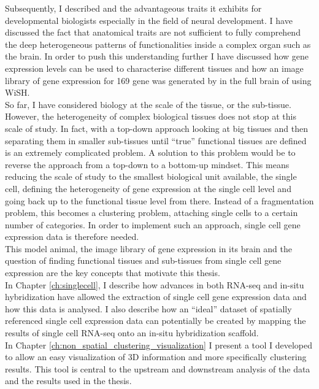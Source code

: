 	Subsequently, I described \platyfull{} and the advantageous traits it exhibits for developmental biologists especially in the field of neural development. I have discussed the fact that anatomical traits are not sufficient to fully comprehend the deep heterogeneous patterns of functionalities inside a complex organ such as the brain. In order to push this understanding further I have discussed how gene expression levels can be used to characterise different tissues and how an image library of gene expression for 169 gene was generated by \cite{Tomer10} in the full brain of \platy{} using WiSH.\\
	
	So far, I have considered biology at the scale of the tissue, or the sub-tissue. However, the heterogeneity of complex biological tissues does not stop at this scale of study. In fact, with a top-down approach looking at big tissues and then separating them in smaller sub-tissues until ``true'' functional tissues are defined is an extremely complicated problem. A solution to this problem would be to reverse the approach from a top-down to a bottom-up mindset. This means reducing the scale of study to the smallest biological unit available, the single cell, defining the heterogeneity of gene expression at the single cell level and going back up to the functional tissue level from there. Instead of a fragmentation problem, this becomes a clustering problem, attaching single cells to a certain number of categories. In order to implement such an approach, single cell gene expression data is therefore needed.\\
	
	This model animal, the image library of gene expression in its brain and the question of finding functional tissues and sub-tissues from single cell gene expression are the key concepts that motivate this thesis.\\
	
	In Chapter \ref{ch:singlecell}, I describe how advances in both RNA-seq and in-situ hybridization have allowed the extraction of single cell gene expression data and how this data is analysed. I also describe how an ``ideal'' dataset of spatially referenced single cell expression data can potentially be created by mapping the results of single cell RNA-seq onto an in-situ hybridization scaffold.\\
	
	In Chapter \ref{ch:non_spatial_clustering_visualization} I present a tool I developed to allow an easy visualization of 3D information and more specifically clustering results. This tool is central to the upstream and downstream analysis of the data and the results used in the thesis.\\
	
